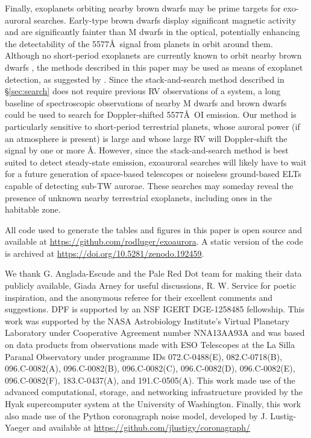 \documentclass{emulateapj}
\begin{document}
Finally, exoplanets orbiting nearby brown dwarfs may be prime targets for exo-auroral searches. Early-type brown dwarfs display significant magnetic activity \citep{West2008} and are significantly fainter than M dwarfs in the optical, potentially enhancing the detectability of the 5577\AA\ signal from planets in orbit around them. Although no short-period exoplanets are currently known to orbit nearby brown dwarfs \citep{He2016}, the methods described in this paper may be used as means of exoplanet detection, as suggested by \citet{SparksFord2002}. Since the stack-and-search method described in \S\ref{sec:search} does not require previous RV observations of a system, a long baseline of spectroscopic observations of nearby M dwarfs and brown dwarfs could be used to search for Doppler-shifted 5577\AA\ OI emission. Our method is particularly sensitive to short-period terrestrial planets, whose auroral power (if an atmosphere is present) is large and whose large RV will Doppler-shift the signal by one or more \AA. However, since the stack-and-search method is best suited to detect steady-state emission, exoauroral searches will likely have to wait for a future generation of space-based telescopes or noiseless ground-based ELTs capable of detecting sub-TW aurorae. These searches may someday reveal the presence of unknown nearby terrestrial exoplanets, including ones in the habitable zone.

\clearpage

All code used to generate the tables and figures in this paper is open source and available at \url{https://github.com/rodluger/exoaurora}. A static version of the code is archived at \url{https://doi.org/10.5281/zenodo.192459}.\\[0in]

\acknowledgments

We thank G. Anglada-Escude and the Pale Red Dot team for making their data publicly available, Giada Arney for useful discussions, R. W. Service for poetic inspiration, and the anonymous referee for their excellent comments and suggestions. DPF is supported by an NSF IGERT DGE-1258485 fellowship. This work was supported by the NASA Astrobiology Institute's Virtual Planetary Laboratory under Cooperative Agreement number NNA13AA93A and was based on data products from observations made with ESO Telescopes at the La Silla Paranal Observatory under programme IDs 072.C-0488(E), 082.C-0718(B), 096.C-0082(A), 096.C-0082(B), 096.C-0082(C), 096.C-0082(D), 096.C-0082(E), 096.C-0082(F), 183.C-0437(A), and 191.C-0505(A). This work made use of the advanced computational, storage, and networking infrastructure provided by the Hyak supercomputer system at the University of Washington. Finally, this work also made use of the Python coronagraph noise model, developed by J. Lustig-Yaeger and available at \url{https://github.com/jlustigy/coronagraph/}



\end{document}
